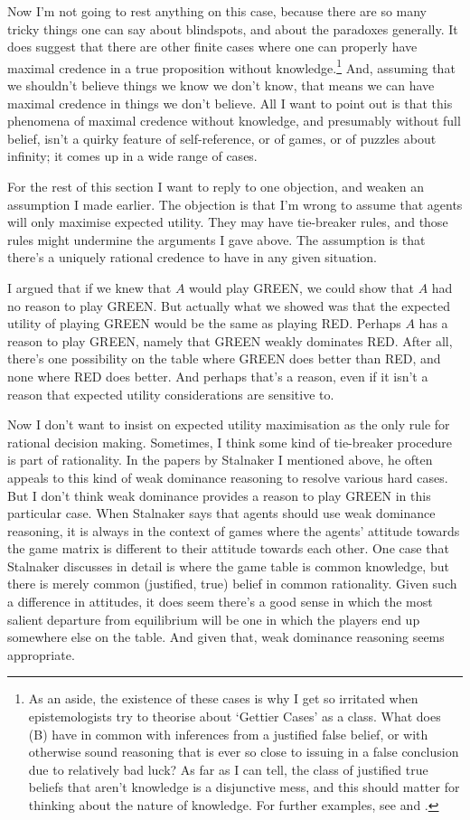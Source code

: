 Now I'm not going to rest anything on this case, because there are so many tricky things one can say about blindspots, and about the paradoxes generally. It does suggest that there are other finite cases where one can properly have maximal credence in a true proposition without knowledge.\footnote{As an aside, the existence of these cases is why I get so irritated when epistemologists try to theorise about `Gettier Cases' as a class. What does (B) have in common with inferences from a justified false belief, or with otherwise sound reasoning that is ever so close to issuing in a false conclusion due to relatively bad luck? As far as I can tell, the class of justified true beliefs that aren't knowledge is a disjunctive mess, and this should matter for thinking about the nature of knowledge. For further examples, see \citet{WilliamsonLofoten} and \citet{Nagel2013-Williamson}.} And, assuming that we shouldn't believe things we know we don't know, that means we can have maximal credence in things we don't believe. All I want to point out is that this phenomena of maximal credence without knowledge, and presumably without full belief, isn't a quirky feature of self-reference, or of games, or of puzzles about infinity; it comes up in a wide range of cases.

For the rest of this section I want to reply to one objection, and weaken an assumption I made earlier. The objection is that I'm wrong to assume that agents will only maximise expected utility. They may have tie-breaker rules, and those rules might undermine the arguments I gave above. The assumption is that there's a uniquely rational credence to have in any given situation.

I argued that if we knew that $A$ would play GREEN, we could show that $A$ had no reason to play GREEN. But actually what we showed was that the expected utility of playing GREEN would be the same as playing RED. Perhaps $A$ has a reason to play GREEN, namely that GREEN weakly dominates RED. After all, there's one possibility on the table where GREEN does better than RED, and none where RED does better. And perhaps that's a reason, even if it isn't a reason that expected utility considerations are sensitive to.

Now I don't want to insist on expected utility maximisation as the only rule for rational decision making. Sometimes, I think some kind of tie-breaker procedure is part of rationality. In the papers by Stalnaker I mentioned above, he often appeals to this kind of weak dominance reasoning to resolve various hard cases. But I don't think weak dominance provides a reason to play GREEN in this particular case. When Stalnaker says that agents should use weak dominance reasoning, it is always in the context of games where the agents' attitude towards the game matrix is different to their attitude towards each other. One case that Stalnaker discusses in detail is where the game table is common knowledge, but there is merely common (justified, true) belief in common rationality. Given such a difference in attitudes, it does seem there's a good sense in which the most salient departure from equilibrium will be one in which the players end up somewhere else on the table. And given that, weak dominance reasoning seems appropriate.

